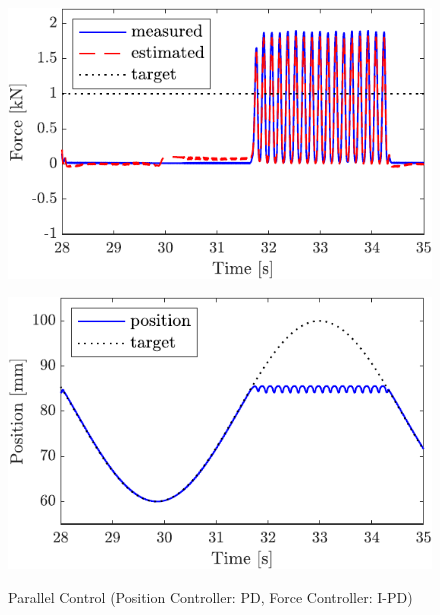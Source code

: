 \begin{figure}[t]
    \begin{minipage}{\minipageratio\hsize}
    \centering
        \includegraphics[keepaspectratio, scale = \minifigscale]{contents/IntegrationControl/figure/SECASQ/crop-FBsw_IPD_force.pdf}
        \label{fig5:crop-FBsw_IPD_force}
    \end{minipage}
    \begin{minipage}{\minipageratio\hsize}
    \centering
        \includegraphics[keepaspectratio, scale = \minifigscale]
        {contents/IntegrationControl/figure/SECASQ/crop-FBsw_IPD_pos.pdf}
        \label{fig5:crop-FBsw_IPD_pos}
    \end{minipage}
    \caption{Parallel Control (Position Controller: PD, Force Controller: I-PD)}
    \label{fig5:crop-FBsw_IPD}
\end{figure}


